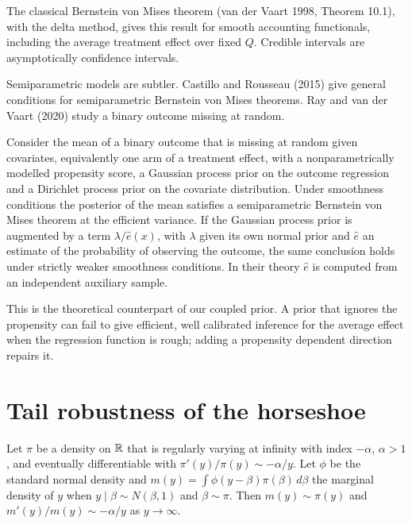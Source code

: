 The classical Bernstein von Mises theorem (van der Vaart 1998, Theorem 10.1), with the delta method, gives this result for smooth accounting functionals, including the average treatment effect over fixed $Q$. Credible intervals are asymptotically confidence intervals.

Semiparametric models are subtler. Castillo and Rousseau (2015) give general conditions for semiparametric Bernstein von Mises theorems. Ray and van der Vaart (2020) study a binary outcome missing at random.

\begin{theorem}
Consider the mean of a binary outcome that is missing at random given covariates, equivalently one arm of a treatment effect, with a nonparametrically modelled propensity score, a Gaussian process prior on the outcome regression and a Dirichlet process prior on the covariate distribution. Under smoothness conditions the posterior of the mean satisfies a semiparametric Bernstein von Mises theorem at the efficient variance. If the Gaussian process prior is augmented by a term $\lambda/\hat e(x)$, with $\lambda$ given its own normal prior and $\hat e$ an estimate of the probability of observing the outcome, the same conclusion holds under strictly weaker smoothness conditions. In their theory $\hat e$ is computed from an independent auxiliary sample.
\end{theorem}

This is the theoretical counterpart of our coupled prior. A prior that ignores the propensity can fail to give efficient, well calibrated inference for the average effect when the regression function is rough; adding a propensity dependent direction repairs it.

\section{Tail robustness of the horseshoe}

\begin{lemma}
Let $\pi$ be a density on $\mathbb{R}$ that is regularly varying at infinity with index $-\alpha$, $\alpha > 1$, and eventually differentiable with $\pi'(y)/\pi(y) \sim -\alpha/y$. Let $\phi$ be the standard normal density and $m(y) = \int\phi(y - \beta)\pi(\beta)\,d\beta$ the marginal density of $y$ when $y \mid \beta \sim N(\beta, 1)$ and $\beta \sim \pi$. Then $m(y) \sim \pi(y)$ and $m'(y)/m(y) \sim -\alpha/y$ as $y \to \infty$.
\end{lemma}

